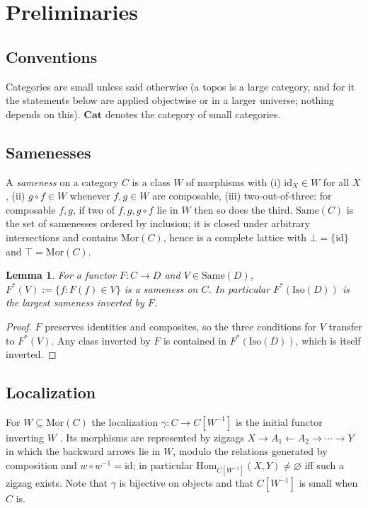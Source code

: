 \documentclass[11pt]{amsart}
\newtheorem{lem}[thm]{Lemma}
\theoremstyle{definition}
\newcommand{\Same}{\mathrm{Same}}
\newcommand{\Mor}{\mathrm{Mor}}
\newcommand{\Iso}{\mathrm{Iso}}
\newcommand{\Hom}{\mathrm{Hom}}
\newcommand{\Cat}{\mathbf{Cat}}
\begin{document}
\section{Preliminaries}\label{sec:prelim}

\subsection{Conventions}
Categories are small unless said otherwise (a topos is a large category, and
for it the statements below are applied objectwise or in a larger universe;
nothing depends on this). $\Cat$ denotes the category of small categories.

\subsection{Samenesses}
A \emph{sameness} on a category $C$ is a class $W$ of morphisms with (i)
$\mathrm{id}_X\in W$ for all $X$, (ii) $g\circ f\in W$ whenever $f,g\in W$ are
composable, (iii) two-out-of-three: for composable $f,g$, if two of
$f,g,g\circ f$ lie in $W$ then so does the third. $\Same(C)$ is the set of
samenesses ordered by inclusion; it is closed under arbitrary
intersections and contains $\Mor(C)$, hence is a complete lattice with
$\bot=\{\mathrm{id}\}$ and $\top=\Mor(C)$.

\begin{lem}\label{lem:pullback}
For a functor $F\colon C\to D$ and $V\in\Same(D)$, $F^*(V):=\{f:F(f)\in V\}$ is a
sameness on $C$. In particular $F^*(\Iso(D))$ is the largest sameness
inverted by $F$.
\end{lem}
\begin{proof}
$F$ preserves identities and composites, so the three conditions for $V$
transfer to $F^*(V)$. Any class inverted by $F$ is contained in
$F^*(\Iso(D))$, which is itself inverted.
\end{proof}

\subsection{Localization}
For $W\subseteq\Mor(C)$ the localization $\gamma\colon C\to C[W^{-1}]$ is the
initial functor inverting $W$ \cite[I.1]{GZ}. Its morphisms are represented
by zigzags $X\to A_1\leftarrow A_2\to\cdots\to Y$ in which the backward
arrows lie in $W$, modulo the relations generated by composition and
$w\circ w^{-1}=\mathrm{id}$; in particular $\Hom_{C[W^{-1}]}(X,Y)\neq\varnothing$ iff
such a zigzag exists. Note that $\gamma$ is bijective on objects and that
$C[W^{-1}]$ is small when $C$ is.
\end{document}
